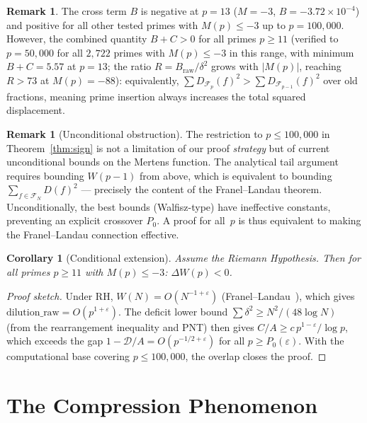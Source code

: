 \documentclass[11pt]{article}
\newtheorem{corollary}[theorem]{Corollary}
\theoremstyle{definition}
\newtheorem{remark}[theorem]{Remark}
\newcommand{\F}{\mathcal{F}}
\begin{document}
\begin{remark}
The cross term $B$ is negative at $p = 13$ ($M = -3$,
$B = -3.72 \times 10^{-4}$) and positive for all other
tested primes with $M(p) \le -3$ up to $p = 100{,}000$.
However, the combined quantity $B + C > 0$ for all primes
$p \ge 11$ (verified to $p = 50{,}000$ for all $2{,}722$ primes
with $M(p) \le -3$ in this range, with minimum $B+C = 5.57$
at $p = 13$; the ratio $R = B_{\mathrm{raw}}/\delta^2$ grows
with $|M(p)|$, reaching $R > 73$ at $M(p) = -88$):
equivalently, $\sum D_{\F_p}(f)^2 > \sum D_{\F_{p-1}}(f)^2$
over old fractions, meaning prime insertion always increases
the total squared displacement.
\end{remark}

\begin{remark}[Unconditional obstruction]\label{rem:obstruction}
The restriction to $p \le 100{,}000$ in
Theorem~\ref{thm:sign} is not a limitation of our proof
\emph{strategy} but of current unconditional bounds on the
Mertens function.  The analytical tail argument requires
bounding $W(p-1)$ from above, which is equivalent to
bounding $\sum_{f \in \F_N}D(f)^2$ --- precisely the content
of the Franel--Landau theorem.  Unconditionally, the best
bounds (Walfisz-type) have ineffective constants, preventing
an explicit crossover $P_0$.  A proof for all~$p$ is thus
equivalent to making the Franel--Landau connection effective.
\end{remark}

\begin{corollary}[Conditional extension]\label{cor:rh-sign}
Assume the Riemann Hypothesis.  Then for all primes $p \ge 11$
with $M(p) \le -3$: $\Delta W(p) < 0$.
\end{corollary}

\begin{proof}[Proof sketch]
Under RH, $W(N) = O(N^{-1+\varepsilon})$
(Franel--Landau~\cite{Franel1924, Landau1924}), which gives
$\text{dilution\_raw} = O(p^{1+\varepsilon})$.
The deficit lower bound $\sum \delta^2 \ge N^2/(48\log N)$
(from the rearrangement inequality and PNT) then gives
$C/A \ge c\,p^{1-\varepsilon}/\log p$, which exceeds the gap
$1 - \mathcal{D}/A = O(p^{-1/2+\varepsilon})$ for all
$p \ge P_0(\varepsilon)$.  With the computational base
covering $p \le 100{,}000$, the overlap closes the proof.
\end{proof}

\section{The Compression Phenomenon}\label{sec:compression}
\end{document}
